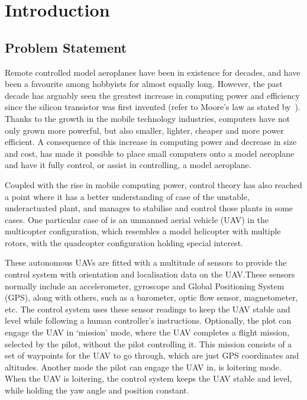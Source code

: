 \chapter{Introduction}
\label{chap1}

\section{Problem Statement}
\label{sec:problem-statement}

Remote controlled model aeroplanes have been in existence for decades, and have been a favourite among hobbyists for almost equally long. However, the past decade has arguably seen the greatest increase in computing power and efficiency since the silicon transistor was first invented (refer to Moore's law as stated by~\cite{moore2005cramming}). Thanks to the growth in the mobile technology industries, computers have not only grown more powerful, but also smaller, lighter, cheaper and more power efficient. A consequence of this increase in computing power and decrease in size and cost, has made it possible to place small computers onto a model aeroplane and have it fully control, or assist in controlling, a model aeroplane. 

Coupled with the rise in mobile computing power, control theory has also reached a point where it has a better understanding of case of the unstable, underactuated plant, and manages to stabilise and control those plants in some cases. One particular case  of is an unmanned aerial vehicle (UAV) in the multicopter configuration, which resembles a model helicopter with multiple rotors, with the quadcopter configuration holding special interest. 

These autonomous UAVs are fitted with a multitude of sensors to provide the control system with orientation and localisation data on the UAV.\@ These sensors normally include an accelerometer, gyroscope and Global Positioning System (GPS), along with others, such as a barometer, optic flow sensor, magnetometer, etc. The control system uses these sensor readings to keep the UAV stable and level while following a human controller's instructions. Optionally, the plot can engage the UAV in `mission' mode, where the UAV completes a flight mission, selected by the pilot, without the pilot controlling it. This mission consists of a set of waypoints for the UAV to go through, which are just GPS coordinates and altitudes. Another mode the pilot can engage the UAV in, is loitering mode. When the UAV is loitering, the control system keeps the UAV stable and level, while holding the yaw angle and position constant. 

